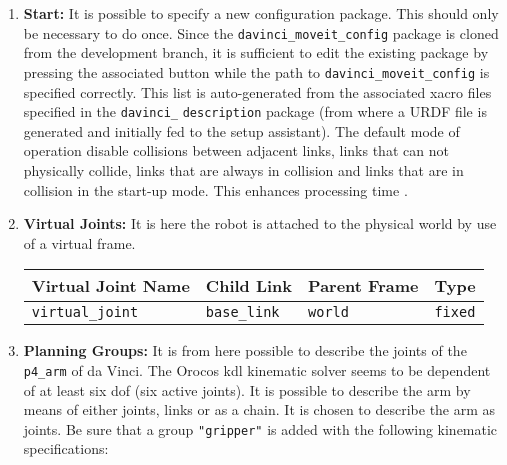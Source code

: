 \begin{enumerate}
\item \textbf{Start:} It is possible to specify a new configuration package. This should only be necessary to do once. Since the \texttt{davinci\_moveit\_config} package is cloned from the development branch, it is sufficient to edit the existing package by pressing the associated button while the path to \texttt{davinci\_moveit\_config} is specified correctly.
This list is auto-generated from the associated xacro files specified in the \texttt{davinci\_} \texttt{description} package (from where a URDF file is generated and initially fed to the setup assistant). The default mode of operation disable collisions between adjacent links, links that can not physically collide, links that are always in collision and links that are in collision in the start-up mode. This enhances processing time \citep{bib:setup_assistant}. %
\item \textbf{Virtual Joints:} It is here the robot is attached to the physical world by use of a virtual frame. %
\begin{table}[H]
\hspace{1cm}\begin{tabular}{l|l|l|l}
\textbf{Virtual Joint Name} & \textbf{Child Link}  & \textbf{Parent Frame}  & \textbf{Type}   \\
\hline
 \texttt{virtual\_joint} & \texttt{base\_link}  & \texttt{world}  &  \texttt{fixed} \\
\end{tabular}
\end{table}
\item \textbf{Planning Groups:} It is from here possible to describe the joints of the \texttt{p4\_arm} of da Vinci. The Orocos \gls{kdl} kinematic solver seems to be dependent of at least six \gls{dof} (six active joints). It is possible to describe the arm by means of either joints, links or as a chain. It is chosen to describe the arm as joints. Be sure that a group \texttt{"gripper"} is added with the following kinematic specifications:

\end{enumerate}
